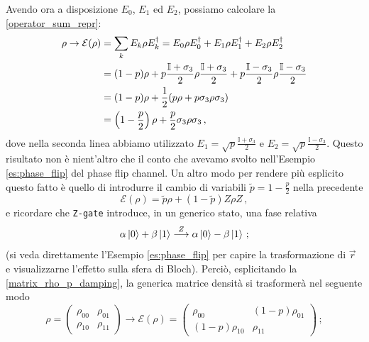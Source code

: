 Avendo ora a disposizione $E_0$, $E_1$ ed $E_2$, possiamo calcolare la \eqref{operator_sum_repr}: 
\begin{align}
    \rho \to \mathcal{E}(\rho) &= \sum_k E_k \rho E_k^\dagger = E_0\rho E_0^\dagger + E_1\rho E_1^\dagger + E_2\rho E_2^\dagger \notag \\
    &= (1-p)\rho + p\frac{\mathbb{I}+\sigma_3}{2}\rho\frac{\mathbb{I}+\sigma_3}{2}+p\frac{\mathbb{I}-\sigma_3}{2}\rho\frac{\mathbb{I}-\sigma_3}{2} \notag \\
    &= (1-p)\rho +\frac 12(p\rho + p\sigma_3\rho \sigma_3) \notag \\
    &= \left( 1-\frac p2 \right) \rho +\frac p2 \sigma_3\rho\sigma_3 \, , \label{matrix_rho_p_damping}
\end{align}
dove nella seconda linea abbiamo utilizzato $E_1 =\sqrt{p} \frac{\mathbb{I}+\sigma_3}{2}$ e $E_2 =\sqrt{p} \frac{\mathbb{I}-\sigma_3}{2}$. Questo risultato non è nient'altro che il conto che avevamo svolto nell'Esempio \ref{es:phase_flip} del phase flip channel. Un altro modo per rendere più esplicito questo fatto è quello di introdurre il cambio di variabili $\tilde{p}=1-\frac p2$ nella precedente
\begin{equation}\label{rho-p-damping}
    \mathcal{E}(\rho) = \tilde{p}\rho+(1-\tilde{p})Z\rho Z \, ,
\end{equation}
e ricordare che \texttt{Z-gate} introduce, in un generico stato, una fase relativa
\begin{equation*}
    \alpha\ket 0+ \beta \ket 1 \overset{Z}{\longrightarrow} \alpha \ket 0 - \beta \ket 1 \, ;
\end{equation*}
(si veda direttamente l'Esempio \ref{es:phase_flip} per capire la trasformazione di $\vec{r}$ e visualizzarne l'effetto sulla sfera di Bloch). Perciò, esplicitando la \eqref{matrix_rho_p_damping}, la generica matrice densità si trasformerà nel seguente modo
\begin{equation*}
    \rho = \begin{pmatrix}
                \rho_{00} & \rho_{01} \\
                \rho_{10} & \rho_{11}
           \end{pmatrix}
    \longrightarrow
    \mathcal{E}(\rho) = \begin{pmatrix}
                            \rho_{00} & (1-p)\rho_{01} \\
                            (1-p)\rho_{10} & \rho_{11}
                        \end{pmatrix} \, ;
\end{equation*}
